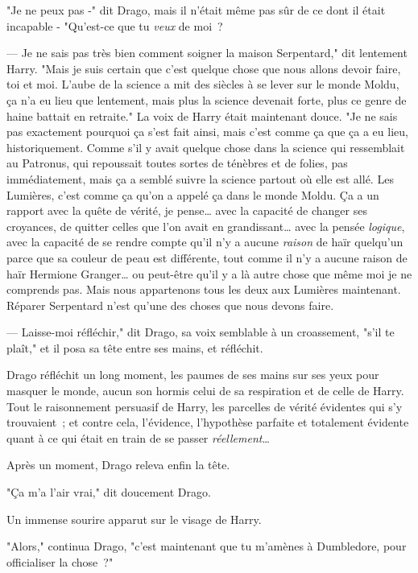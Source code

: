 "Je ne peux pas -" dit Drago, mais il n'était même pas sûr de ce dont il était incapable - "Qu'est-ce que tu \emph{veux} de moi~?

--- Je ne sais pas très bien comment soigner la maison Serpentard," dit lentement Harry. "Mais je suis certain que c'est quelque chose que nous allons devoir faire, toi et moi. L'aube de la science a mit des siècles à se lever sur le monde Moldu, ça n'a eu lieu que lentement, mais plus la science devenait forte, plus ce genre de haine battait en retraite." La voix de Harry était maintenant douce. "Je ne sais pas exactement pourquoi ça s'est fait ainsi, mais c'est comme ça que ça a eu lieu, historiquement. Comme s'il y avait quelque chose dans la science qui ressemblait au Patronus, qui repoussait toutes sortes de ténèbres et de folies, pas immédiatement, mais ça a semblé suivre la science partout où elle est allé. Les Lumières, c'est comme ça qu'on a appelé ça dans le monde Moldu. Ça a un rapport avec la quête de vérité, je pense… avec la capacité de changer ses croyances, de quitter celles que l'on avait en grandissant… avec la pensée \emph{logique}, avec la capacité de se rendre compte qu'il n'y a aucune \emph{raison} de haïr quelqu'un parce que sa couleur de peau est différente, tout comme il n'y a aucune raison de haïr Hermione Granger… ou peut-être qu'il y a là autre chose que même moi je ne comprends pas. Mais nous appartenons tous les deux aux Lumières maintenant. Réparer Serpentard n'est qu'une des choses que nous devons faire.

--- Laisse-moi réfléchir," dit Drago, sa voix semblable à un croassement, "s'il te plaît," et il posa sa tête entre ses mains, et réfléchit.

\later

Drago réfléchit un long moment, les paumes de ses mains sur ses yeux pour masquer le monde, aucun son hormis celui de sa respiration et de celle de Harry. Tout le raisonnement persuasif de Harry, les parcelles de vérité évidentes qui s'y trouvaient~; et contre cela, l'évidence, l'hypothèse parfaite et totalement évidente quant à ce qui était en train de se passer \emph{réellement}…

Après un moment, Drago releva enfin la tête.

"Ça m'a l'air vrai," dit doucement Drago.

Un immense sourire apparut sur le visage de Harry.

"Alors," continua Drago, "c'est maintenant que tu m'amènes à Dumbledore, pour officialiser la chose~?"

